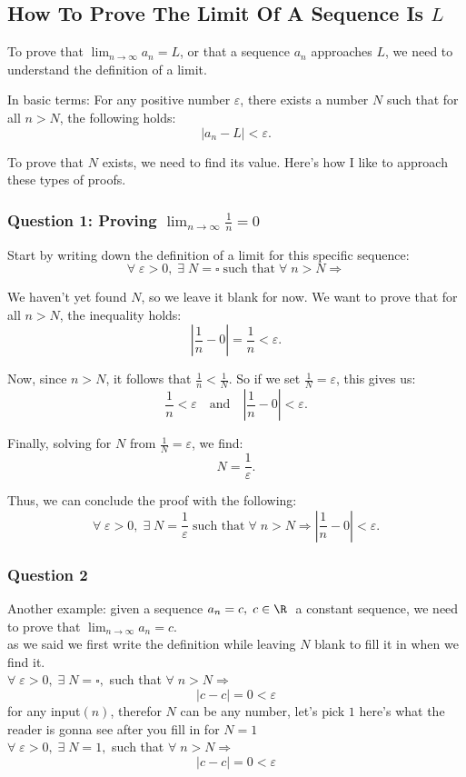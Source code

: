 \subsection{How To Prove The Limit Of A Sequence Is \(L\)}
To prove that \(\lim_{n \to \infty} a_n = L\), or that a sequence \(a_n\) approaches \(L\), we need to understand the definition of a limit.

\noindent In basic terms:  
For any positive number \(\varepsilon\), there exists a number \(N\) such that for all \(n > N\), the following holds:  
\[
|a_n - L| < \varepsilon.
\]

\noindent To prove that \(N\) exists, we need to find its value. Here's how I like to approach these types of proofs.

\subsubsection{Question 1: Proving \(\lim_{n \to \infty} \frac{1}{n} = 0\)}

Start by writing down the definition of a limit for this specific sequence:  
\[
\forall \; \varepsilon > 0, \; \exists \; N = \square \; \text{such that} \; \forall \; n > N \Longrightarrow
\]

We haven’t yet found \(N\), so we leave it blank for now. We want to prove that for all \(n > N\), the inequality holds:  
\[
|\frac{1}{n} - 0| = \frac{1}{n} < \varepsilon.
\]

Now, since \(n > N\), it follows that \(\frac{1}{n} < \frac{1}{N}\). So if we set \(\frac{1}{N} = \varepsilon\), this gives us:  
\[
\frac{1}{n} < \varepsilon \quad \text{and} \quad |\frac{1}{n} - 0| < \varepsilon.
\]

Finally, solving for \(N\) from \(\frac{1}{N} = \varepsilon\), we find:  
\[
N = \frac{1}{\varepsilon}.
\]

Thus, we can conclude the proof with the following:  
\[
\forall \; \varepsilon > 0, \; \exists \; N = \frac{1}{\varepsilon} \; \text{such that} \; \forall \; n > N \Longrightarrow |\frac{1}{n} - 0| < \varepsilon.
\]

\subsubsection{Question 2}
Another example: given a sequence $a_n = c ,\; c\in \R\;$ a constant sequence, we need to prove that $\lim_{n\to\infty}a_n = c$.\\
as we said we first write the definition while leaving $N$ blank to fill it in when we find it.\\
$\forall \; \varepsilon>0,\; \exists \; N = \square ,$ such that $\forall \; n>N \Longrightarrow$\\
\[
    |c-c| = 0 <\varepsilon
\]
for any input$(n)$, therefor $N$ can be any number, let's pick $1$
here's what the reader is gonna see after you fill in for $N=1$\\
$\forall \; \varepsilon>0,\; \exists \; N = 1 ,$ such that $\forall \; n>N \Longrightarrow$\\
\[
    |c-c|=0<\varepsilon
\]

